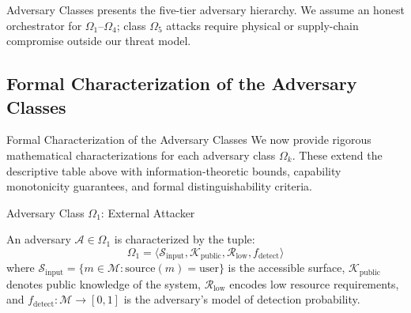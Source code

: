 \documentclass[
  ignorenonframetext,
]{beamer}
\providecommand{\Cref}[1]{\texttt{\detokenize{#1}}}
\begin{document}
\begin{frame}[allowframebreaks]{Adversary Classes}
\Cref{tab:adversary-classes} presents the five-tier adversary hierarchy.
We assume an honest orchestrator for \(\Omega_1\)--\(\Omega_4\); class
\(\Omega_5\) attacks require physical or supply-chain compromise outside
our threat model.
\end{frame}

\subsection{Formal Characterization of the Adversary
Classes}\label{sec:adversary-formal}

\begin{frame}[allowframebreaks]{Formal Characterization of the Adversary
Classes}
We now provide rigorous mathematical characterizations for each
adversary class \(\Omega_k\). These extend the descriptive table above
with information-theoretic bounds, capability monotonicity guarantees,
and formal distinguishability criteria.
\end{frame}

\begin{frame}[allowframebreaks]{Adversary Class \(\Omega_1\): External
Attacker}
\protect{}\label{adversary-class-omega_1-external-attacker}
\begin{definition}
\label{def:omega1}
An adversary $\mathcal{A} \in \Omega_1$ is characterized by the tuple:
\begin{equation}
\label{eq:omega1-formal}
\Omega_1 = \langle \mathcal{S}_{\text{input}}, \mathcal{K}_{\text{public}}, \mathcal{R}_{\text{low}}, f_{\text{detect}} \rangle
\end{equation}
where $\mathcal{S}_{\text{input}} = \{m \in \mathcal{M} : \text{source}(m) = \text{user}\}$ is the accessible surface, $\mathcal{K}_{\text{public}}$ denotes public knowledge of the system, $\mathcal{R}_{\text{low}}$ encodes low resource requirements, and $f_{\text{detect}}: \mathcal{M} \to [0,1]$ is the adversary's model of detection probability.
\end{definition}

\end{frame}
\end{document}
